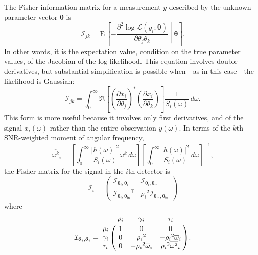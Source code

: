 \documentclass[amsmath,amssymb,aps,prx,reprint,nopreprintnumbers,nofootinbib]{revtex4-1}
\begin{document}
The Fisher information matrix for a measurement $y$ described by the unknown parameter vector $\bm{\theta}$ is
%
\begin{equation}\label{eq:general-fisher-matrix}
    \mathcal{I}_{jk} = \mathrm{E} \, \left[
        -\frac{\partial^2 \log
            \mathcal{L}(y_i ; \bm\theta)}
            {\partial \theta_j \theta_k}
    \middle| \bm\theta
    \right].
\end{equation}
%
In other words, it is the expectation value, condition on the true parameter values, of the Jacobian of the log likelihood. This equation involves double derivatives, but substantial simplification is possible when---as in this case---the likelihood is Gaussian:
%
\begin{equation}\label{eq:gaussian-fisher-matrix}
    \mathcal{I}_{jk} = \int_0^\infty \Re \left[
        \left(\frac{\partial x_i}{\partial \theta_j}\right)^*
        \left(\frac{\partial x_i}{\partial \theta_k}\right)
    \right] \frac{1}{S_i(\omega)} \, d\omega.
\end{equation}
%
This form is more useful because it involves only first derivatives, and of the signal $x_i (\omega)$ rather than the entire observation $y (\omega)$. In terms of the $k$th \ac{SNR}-weighted moment of angular frequency,
%
\begin{equation}\label{eq:angular-frequency-moments}
    {\overline{\omega^k}}_i =
        \left[ \int_0^\infty \frac{|h (\omega)|^2}{S_i(\omega)} \omega^k \, d\omega \right]
        \left[ \int_0^\infty \frac{|h (\omega)|^2}{S_i(\omega)} \, d\omega \right]^{-1},
\end{equation}
%
the Fisher matrix for the signal in the $i$th detector is
%
\begin{equation}
    \mathcal{I}_i = \left(
        \begin{array}{cc}
            \mathcal{I}_{\bm\theta_i,\bm\theta_i} &
            \mathcal{I}_{\bm\theta_i,\bm\theta_\mathrm{in}} \\
            {\mathcal{I}_{\bm\theta_i,\bm\theta_\mathrm{in}}}^\intercal &
            {\rho_i}^2 \mathcal{I}_{\bm\theta_\mathrm{in},\bm\theta_\mathrm{in}}
        \end{array}
    \right)
\end{equation}
%
where
%
\begin{equation}\label{eq:fisher-matrix}
    \mathcal{I}_{\bm\theta_i,\bm\theta_i} = \bordermatrix{
        ~ & \rho_i & \gamma_i & \tau_i \cr
        \rho_i & 1 & 0 & 0 \cr
        \gamma_i & 0 & {\rho_i}^2 & -{\rho_i}^2 {\overline{\omega}}_i \cr
        \tau_i & 0 & -{\rho_i}^2 {\overline{\omega}}_i & {\rho_i}^2 {\overline{\omega^2}}_i
    }.
\end{equation}
\end{document}
